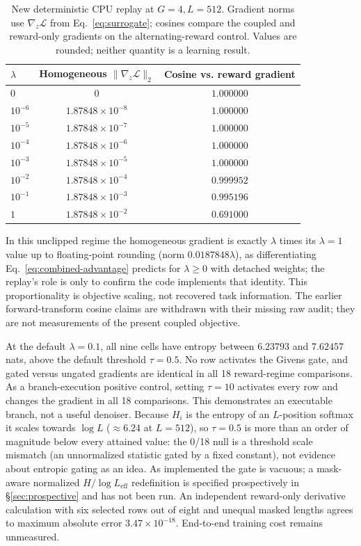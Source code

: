 \documentclass{article}
\begin{document}
\begin{table}[t]
\centering
\caption{New deterministic CPU replay at $G=4,L=512$. Gradient norms use
$\nabla_z\mathcal L$ from Eq.~\eqref{eq:surrogate}; cosines compare the coupled
and reward-only gradients on the alternating-reward control. Values are rounded;
neither quantity is a learning result.}
\label{tab:lambda}
\small
\begin{tabular}{lcc}
\toprule
$\lambda$ & Homogeneous $\|\nabla_z\mathcal L\|_2$ & Cosine vs. reward gradient \\
\midrule
$0$       & $0$                    & $1.000000$ \\
$10^{-6}$ & $1.87848\times10^{-8}$ & $1.000000$ \\
$10^{-5}$ & $1.87848\times10^{-7}$ & $1.000000$ \\
$10^{-4}$ & $1.87848\times10^{-6}$ & $1.000000$ \\
$10^{-3}$ & $1.87848\times10^{-5}$ & $1.000000$ \\
$10^{-2}$ & $1.87848\times10^{-4}$ & $0.999952$ \\
$10^{-1}$ & $1.87848\times10^{-3}$ & $0.995196$ \\
$1$       & $1.87848\times10^{-2}$ & $0.691000$ \\
\bottomrule
\end{tabular}
\end{table}

In this unclipped regime the homogeneous gradient is exactly
$\lambda$ times its $\lambda=1$ value up to floating-point rounding
(norm $0.0187848\lambda$), as differentiating
Eq.~\eqref{eq:combined-advantage} predicts for $\lambda\ge0$ with
detached weights; the replay's role is only to confirm the code
implements that identity.
This proportionality is objective scaling, not recovered task information.
The earlier forward-transform cosine claims are withdrawn with their missing
raw audit; they are not measurements of the present coupled objective.

At the default $\lambda=0.1$, all nine cells have entropy between
$6.23793$ and $7.62457$ nats, above the default threshold $\tau=0.5$.
No row activates the Givens gate, and gated versus ungated gradients are
identical in all 18 reward-regime comparisons. As a branch-execution positive
control, setting $\tau=10$ activates every row and changes the gradient in all
18 comparisons. This demonstrates an executable branch, not a useful denoiser.
Because $H_i$ is the entropy of an $L$-position softmax it scales towards
$\log L$ ($\approx6.24$ at $L=512$), so $\tau=0.5$ is more than an order
of magnitude below every attained value: the 0/18 null is a threshold
scale mismatch (an unnormalized statistic gated by a fixed constant), not
evidence about entropic gating as an idea. As implemented the gate is
vacuous; a mask-aware normalized $H/\log L_{\mathrm{eff}}$ redefinition
is specified prospectively in \S\ref{sec:prospective} and has not been run.
An independent reward-only derivative calculation with six selected rows out
of eight and unequal masked lengths agrees to maximum absolute error
$3.47\times10^{-18}$. End-to-end training cost remains unmeasured.
\end{document}
